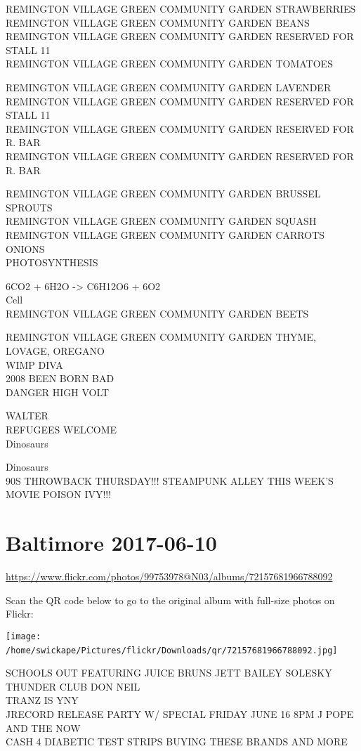 \documentclass[10pt,letterpaper]{article}
\begin{document}
REMINGTON VILLAGE GREEN COMMUNITY GARDEN STRAWBERRIES\\
REMINGTON VILLAGE GREEN COMMUNITY GARDEN BEANS\\
REMINGTON VILLAGE GREEN COMMUNITY GARDEN RESERVED FOR STALL 11\\
REMINGTON VILLAGE GREEN COMMUNITY GARDEN TOMATOES

REMINGTON VILLAGE GREEN COMMUNITY GARDEN LAVENDER\\
REMINGTON VILLAGE GREEN COMMUNITY GARDEN RESERVED FOR STALL 11\\
REMINGTON VILLAGE GREEN COMMUNITY GARDEN RESERVED FOR R. BAR\\
REMINGTON VILLAGE GREEN COMMUNITY GARDEN RESERVED FOR R. BAR

REMINGTON VILLAGE GREEN COMMUNITY GARDEN BRUSSEL SPROUTS\\
REMINGTON VILLAGE GREEN COMMUNITY GARDEN SQUASH\\
REMINGTON VILLAGE GREEN COMMUNITY GARDEN CARROTS ONIONS\\
PHOTOSYNTHESIS

6CO2 + 6H2O {-}> C6H12O6 + 6O2\\
Cell\\
REMINGTON VILLAGE GREEN COMMUNITY GARDEN BEETS

REMINGTON VILLAGE GREEN COMMUNITY GARDEN THYME, LOVAGE, OREGANO\\
WIMP DIVA\\
2008 BEEN BORN BAD\\
DANGER HIGH VOLT

WALTER\\
REFUGEES WELCOME\\
Dinosaurs

Dinosaurs\\
90S THROWBACK THURSDAY!!! STEAMPUNK ALLEY THIS WEEK'S MOVIE POISON IVY!!!
\

\section*{Baltimore 2017-06-10}

\url{https://www.flickr.com/photos/99753978@N03/albums/72157681966788092}

Scan the QR code below to go to the original album with full-size photos on Flickr:

\texttt{[image: /home/swickape/Pictures/flickr/Downloads/qr/72157681966788092.jpg]}
\

SCHOOLS OUT FEATURING JUICE BRUNS JETT BAILEY SOLESKY THUNDER CLUB DON NEIL\\
TRANZ IS YNY\\
JRECORD RELEASE PARTY W/ SPECIAL FRIDAY JUNE 16 8PM J POPE AND THE NOW\\
CASH 4 DIABETIC TEST STRIPS BUYING THESE BRANDS AND MORE
\end{document}
